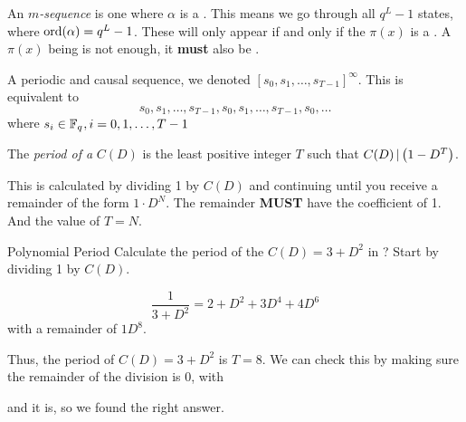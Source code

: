 \begin{definition}[$m$-Sequence]\label{def:M_Sequence}
  An \emph{$m$-sequence} is one where $\alpha$ is a .
  This means we go through all $q^{L}-1$ states, where $\operatorname{\operatorname{ord}}(\alpha) = q^{L}-1$.
  These will only appear if and only if the  $\pi(x)$ is a .
  A $\pi(x)$ being  is not enough, it \textbf{must} also be .
\end{definition}

A periodic and causal sequence, we denoted ${\left[ s_{0}, s_{1}, \ldots, s_{T-1} \right]}^{\infty}$.
This is equivalent to
\begin{equation*}
  s_{0}, s_{1}, \ldots, s_{T-1}, s_{0}, s_{1}, \ldots, s_{T-1}, s_{0}, \ldots
\end{equation*}
where $s_{i} \in \mathbb{F}_{q^{}}, i = 0, 1, \ldots, T-1$

\begin{definition}\label{def:Polynomial_Period}
  The \emph{period of a } $C(D)$ is the least positive integer $T$ such that $C(D) \operatorname{\vert} \left( 1-D^{T} \right)$.

  This is calculated by dividing 1 by $C(D)$ and continuing until you receive a remainder of the form $1\cdot D^{N}$.
  The remainder \textbf{MUST} have the coefficient of 1.
  And the value of $T=N$.
\end{definition}

\begin{example}{Polynomial Period}
  Calculate the period of the  $C(D) = 3 + D^{2}$ in ?
  \tcblower{}
  Start by dividing 1 by $C(D)$.

  \begin{equation*}
    \frac{1}{3+D^{2}} = 2 + D^{2} + 3D^{4} + 4D^{6}
  \end{equation*}
  with a remainder of $1D^{8}$.

  Thus, the period of $C(D) = 3+D^{2}$ is $T=8$.
  We can check this by making sure the remainder of the division is 0, with
  \begin{center}
  \end{center}
  and it is, so we found the right answer.
\end{example}

